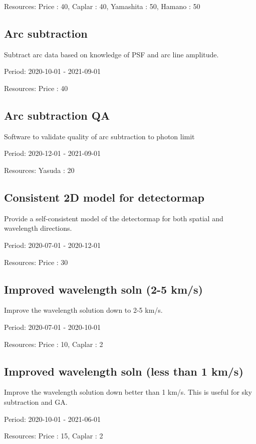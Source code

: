 Resources: Price : 40, Caplar : 40, Yamashita : 50, Hamano : 50

\subsection{Arc subtraction}

Subtract arc data based on knowledge of PSF and arc line amplitude.

Period: 2020-10-01 - 2021-09-01

Resources: Price : 40

\subsection{Arc subtraction QA}

Software to validate quality of arc subtraction to photon limit

Period: 2020-12-01 - 2021-09-01

Resources: Yasuda : 20

\subsection{Consistent 2D model for detectormap}

Provide a self-consistent model of the detectormap for both spatial and wavelength directions.

Period: 2020-07-01 - 2020-12-01

Resources: Price : 30

\subsection{Improved wavelength soln (2-5 km/s)}

Improve the wavelength solution down to 2-5 km/s.

Period: 2020-07-01 - 2020-10-01

Resources: Price : 10, Caplar : 2

\subsection{Improved wavelength soln (less than 1 km/s)}

Improve the wavelength solution down better than 1 km/s. This is useful for sky subtraction and GA.

Period: 2020-10-01 - 2021-06-01

Resources: Price : 15, Caplar : 2

